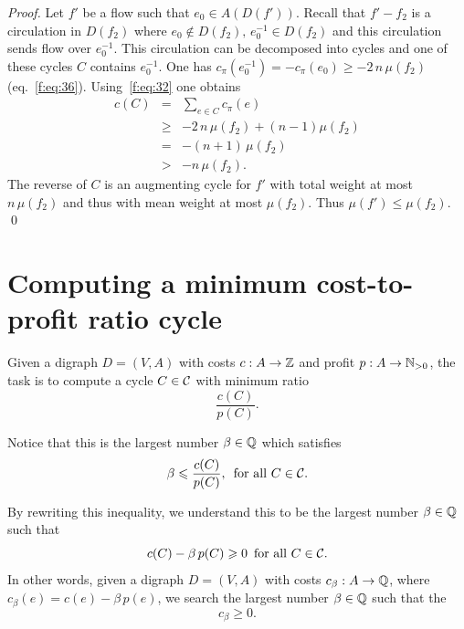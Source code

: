 \begin{proof}
  Let $f'$ be a flow such that $e_0\in A(D(f'))$. Recall that $f' - f_2$
  is a circulation in $D(f_2)$ where $e_0\notin D(f_2), \,e_0^{-1}\in D(f_2)$  and this
  circulation sends flow over $e_0^{-1}$. This circulation can be
  decomposed into cycles and one of these cycles $C$ contains
  $e_0^{-1}$.  One has $c_\pi(e_0^{-1}) = -c_\pi(e_0) \geq -  2 \, n \,
  \mu(f_2)$ (eq.~\eqref{f:eq:36}). Using~\eqref{f:eq:32} one obtains
  \begin{eqnarray}
    \label{f:eq:37}
    c(C) & = &  \sum_{e \in C} c_\pi(e) \\
         & \geq &  -  2 \, n \,  \mu(f_2) + (n-1) \mu(f_2) \\
         & = & - (n +1)\, \mu(f_2) \\
         & > & -n \, \mu(f_2). 
  \end{eqnarray}
  The reverse of $C$ is an augmenting cycle for $f'$ with total weight
  at most $n \, \mu(f_2)$ and thus with mean weight at most
  $\mu(f_2)$. Thus $\mu(f') \leq \mu(f_2)$.  \qed
\end{proof}






\section{Computing a minimum cost-to-profit ratio cycle}
\label{sec:comp-minim-cost}

Given a digraph $D = (V,A)$ with costs $c:A\to\mathbb{Z}$ and profit $p:A \to
\mathbb{N}_{>0}$, the task is to compute a cycle $C \in \mathcal{C}$ with minimum
ratio 
\begin{equation}
  \label{f:eq:31}
  \frac{c(C)}{p(C)}.
\end{equation}

Notice that this is the largest number $\beta\in \mathbb{Q}$ which satisfies 
\begin{equation}
  \beta\leqslant  \frac{c(C)}{p(C)}, \, \text{ for all } C \in \mathcal{C}. 
\end{equation}

By rewriting this inequality, we understand this to be the largest
number $\beta\in \mathbb{Q}$ such that 
\begin{equation}
  c(C) - \beta\, p(C) \geqslant0 \, \text{ for all } C \in \mathcal{C}. 
\end{equation}
In other words, given a digraph $D= (V,A)$ with costs 
$c_\beta:A \to \mathbb{Q}$, where $c_\beta(e) = c(e) - \beta\,p(e)$,
we search the largest number $\beta \in \mathbb{Q}$ such that the
\begin{equation}
   c_{\beta} \geq 0.
\end{equation}

